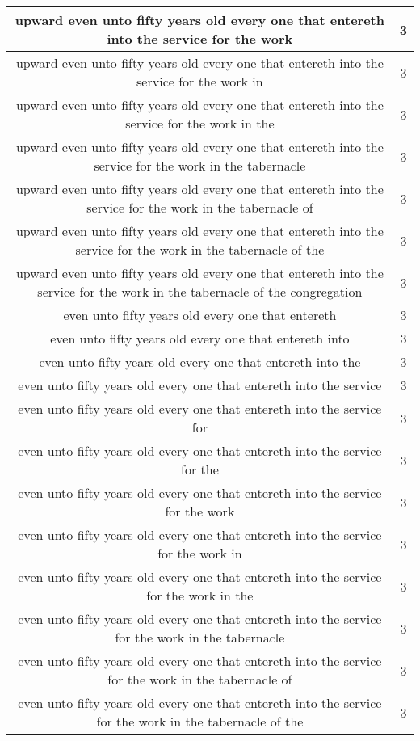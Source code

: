 \begin{center}
\begin{longtable}{|c|c|}
upward even unto fifty years old every one that entereth into the service for the work & 3\\ \hline 
upward even unto fifty years old every one that entereth into the service for the work in & 3\\ \hline 
upward even unto fifty years old every one that entereth into the service for the work in the & 3\\ \hline 
upward even unto fifty years old every one that entereth into the service for the work in the tabernacle & 3\\ \hline 
upward even unto fifty years old every one that entereth into the service for the work in the tabernacle of & 3\\ \hline 
upward even unto fifty years old every one that entereth into the service for the work in the tabernacle of the & 3\\ \hline 
upward even unto fifty years old every one that entereth into the service for the work in the tabernacle of the congregation & 3\\ \hline 
even unto fifty years old every one that entereth & 3\\ \hline 
even unto fifty years old every one that entereth into & 3\\ \hline 
even unto fifty years old every one that entereth into the & 3\\ \hline 
even unto fifty years old every one that entereth into the service & 3\\ \hline 
even unto fifty years old every one that entereth into the service for & 3\\ \hline 
even unto fifty years old every one that entereth into the service for the & 3\\ \hline 
even unto fifty years old every one that entereth into the service for the work & 3\\ \hline 
even unto fifty years old every one that entereth into the service for the work in & 3\\ \hline 
even unto fifty years old every one that entereth into the service for the work in the & 3\\ \hline 
even unto fifty years old every one that entereth into the service for the work in the tabernacle & 3\\ \hline 
even unto fifty years old every one that entereth into the service for the work in the tabernacle of & 3\\ \hline 
even unto fifty years old every one that entereth into the service for the work in the tabernacle of the & 3\\ \hline 

\end{longtable}
\end{center}
